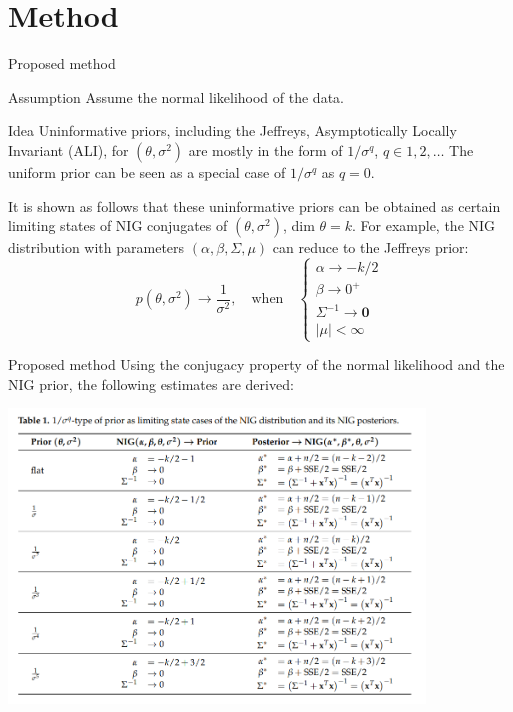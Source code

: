 \documentclass{beamer}
\begin{document}
\section{Method}
\begin{frame}{Proposed method}
\begin{block}{Assumption}
    Assume the normal likelihood of the data.
\end{block}
\begin{alertblock}{Idea}
        Uninformative priors, including the Jeffreys, Asymptotically Locally Invariant (ALI), for $(\theta, \sigma^2)$ are mostly in the form of $1/\sigma^q$, $q \in {1, 2, \ldots}$ The uniform prior can be seen as a special case of $1/\sigma^q$ as $q = 0$.
\end{alertblock}
    \begin{block}{}
    It is shown as follows that these uninformative priors can be obtained as certain limiting states of NIG conjugates of $(\theta,\sigma^2)$, dim $\theta = k$. For example, the NIG distribution with parameters $(\alpha,\beta,\Sigma,\mu)$ can reduce to the Jeffreys prior:
    \vspace{-0.5cm}
$$
p(\theta,\sigma^2) \rightarrow \frac{1}{\sigma^2}, \quad\text{when}\quad\left\{
\begin{array}{l}
\alpha \rightarrow -k/2 \\
\beta \rightarrow 0^+ \\
\Sigma^{-1} \rightarrow \mathbf{0} \\
|\mu| < \infty
\end{array}
\right.
$$
\end{block}
\end{frame}

\begin{frame}{Proposed method}
Using the conjugacy property of the normal likelihood and the NIG prior, the following estimates are derived:
\vspace{-0.1cm}
       \begin{center}
        \includegraphics[width=0.83\textwidth]{figs/table.png}
        \end{center}

\end{frame}
\end{document}
